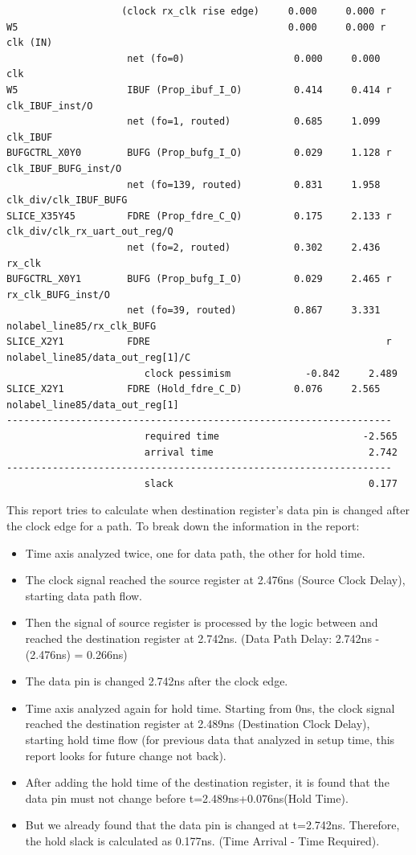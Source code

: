 \documentclass{report}
\newenvironment{narrowmargins}{
    \begin{adjustwidth}{-0.75in}{0.25in} %
}{
    \end{adjustwidth}
}
\begin{document}
\begin{narrowmargins}
\begin{verbatim}
                    (clock rx_clk rise edge)     0.000     0.000 r  
W5                                               0.000     0.000 r  clk (IN)
                     net (fo=0)                   0.000     0.000    clk
W5                   IBUF (Prop_ibuf_I_O)         0.414     0.414 r  clk_IBUF_inst/O
                     net (fo=1, routed)           0.685     1.099    clk_IBUF
BUFGCTRL_X0Y0        BUFG (Prop_bufg_I_O)         0.029     1.128 r  clk_IBUF_BUFG_inst/O
                     net (fo=139, routed)         0.831     1.958    clk_div/clk_IBUF_BUFG
SLICE_X35Y45         FDRE (Prop_fdre_C_Q)         0.175     2.133 r  clk_div/clk_rx_uart_out_reg/Q
                     net (fo=2, routed)           0.302     2.436    rx_clk
BUFGCTRL_X0Y1        BUFG (Prop_bufg_I_O)         0.029     2.465 r  rx_clk_BUFG_inst/O
                     net (fo=39, routed)          0.867     3.331    nolabel_line85/rx_clk_BUFG
SLICE_X2Y1           FDRE                                         r  nolabel_line85/data_out_reg[1]/C
                        clock pessimism             -0.842     2.489    
SLICE_X2Y1           FDRE (Hold_fdre_C_D)         0.076     2.565    nolabel_line85/data_out_reg[1]
-------------------------------------------------------------------
                        required time                         -2.565    
                        arrival time                           2.742    
-------------------------------------------------------------------
                        slack                                  0.177    
\end{verbatim}    
\end{narrowmargins}
This report tries to calculate when destination register's data pin is changed after the clock edge for a path.
To break down the information in the report:
\begin{itemize}
    \item Time axis analyzed twice, one for data path, the other for hold time.
    \item The clock signal reached the source register at 2.476ns (Source Clock Delay), starting data path flow.
    \item Then the signal of source register is processed by the logic between and reached the destination register at 2.742ns. (Data Path Delay: 2.742ns - (2.476ns) = 0.266ns)
    \item The data pin is changed 2.742ns after the clock edge.
    \item Time axis analyzed again for hold time. Starting from 0ns, the clock signal reached the destination register at 2.489ns (Destination Clock Delay), starting hold time flow (for previous data that analyzed in setup time, this report looks for future change not back).
    \item After adding the hold time of the destination register, it is found that the data pin must not change before t=2.489ns+0.076ns(Hold Time).
    \item But we already found that the data pin is changed at t=2.742ns. Therefore, the hold slack is calculated as 0.177ns. (Time Arrival - Time Required).
\end{itemize}
\end{document}
